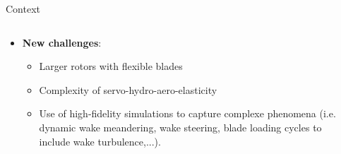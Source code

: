 \documentclass[10pt]{beamer}
\begin{document}
\begin{frame}{Context}
\begin{columns}
\begin{column}{0.6\textwidth}
\begin{itemize}
\item[\ding{113}] \textbf{New challenges}:
\begin{itemize}
\justifying
\item[\ding{252}] Larger rotors with flexible blades
\item[\ding{252}] Complexity of servo-hydro-aero-elasticity
\item[\ding{252}] Use of high-fidelity simulations to capture complexe phenomena (i.e. dynamic wake meandering, wake steering, blade loading cycles to include wake turbulence,...).
\end{itemize}
\end{itemize}
\end{column}
\begin{column}{0.4\textwidth}
\end{column}
\end{columns}
\end{frame}
\end{document}
